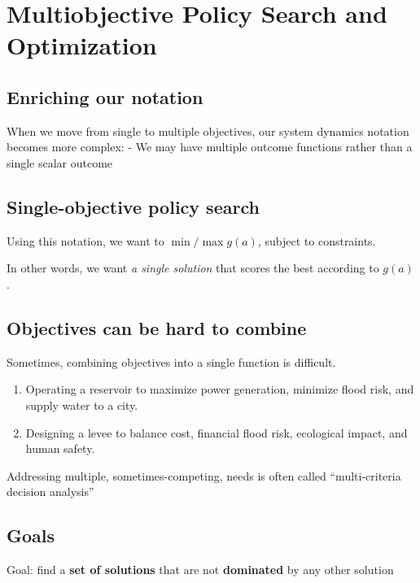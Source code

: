 \documentclass[
  letterpaper,
  DIV=11,
  numbers=noendperiod]{scrreprt}
\providecommand{\tightlist}{%
  \setlength{\itemsep}{0pt}\setlength{\parskip}{0pt}}
\begin{document}
\section{Multiobjective Policy Search and
Optimization}\label{multiobjective-policy-search-and-optimization}

\subsection{Enriching our notation}\label{enriching-our-notation}

When we move from single to multiple objectives, our system dynamics
notation becomes more complex: - We may have multiple outcome functions
rather than a single scalar outcome

\subsection{Single-objective policy
search}\label{single-objective-policy-search}

Using this notation, we want to \(\min / \max g(a)\), subject to
constraints.

In other words, we want \emph{a single solution} that scores the best
according to \(g(a)\).

\subsection{Objectives can be hard to
combine}\label{objectives-can-be-hard-to-combine}

Sometimes, combining objectives into a single function is difficult.

\begin{enumerate}
\def\labelenumi{\arabic{enumi}.}
\tightlist
\item
  Operating a reservoir to maximize power generation, minimize flood
  risk, and supply water to a city.
\item
  Designing a levee to balance cost, financial flood risk, ecological
  impact, and human safety.
\end{enumerate}

Addressing multiple, sometimes-competing, needs is often called
``multi-criteria decision analysis''

\subsection{Goals}\label{goals}

Goal: find a \textbf{set of solutions} that are not \textbf{dominated}
by any other solution
\end{document}
